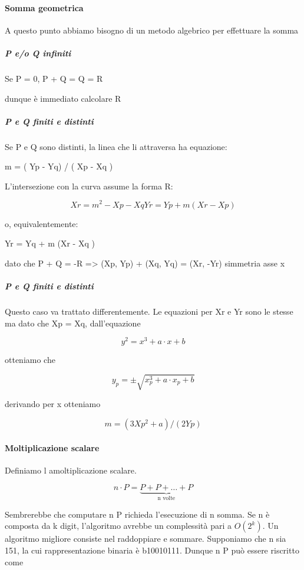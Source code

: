 \documentclass{book}
\theoremstyle{definition}
\begin{document}
\paragraph{Somma geometrica}

A questo punto abbiamo bisogno di un metodo algebrico per effettuare la somma

\subparagraph{P e/o Q infiniti}

Se P = 0, P + Q = Q = R

dunque è immediato calcolare R

\subparagraph{P e Q finiti e distinti}

Se P e Q sono distinti, la linea che li attraversa ha equazione:

m = ( Yp - Yq) / ( Xp - Xq )

L'intersezione con la curva assume la forma R:

\[
    Xr = m^{2} - Xp - Xq
    Yr = Yp + m ( Xr - Xp )
\]

o, equivalentemente:

Yr = Yq + m (Xr - Xq )

dato che P + Q = -R => (Xp, Yp) + (Xq, Yq) = (Xr, -Yr) simmetria asse x

\subparagraph{P e Q finiti e distinti}

Questo caso va trattato differentemente. Le equazioni per Xr e Yr sono le stesse ma dato che Xp = Xq, dall'equazione

\[
    y^{2} = x^{3} + a \cdot x + b
\]

otteniamo che

\[
    y_{p} = \pm \sqrt{x_{p}^{3} + a \cdot x_{p} + b}
\]

derivando per x otteniamo

\[
    m = ( 3 Xp^{2} + a ) / ( 2 Yp )
\]

\paragraph{Moltiplicazione scalare}

Definiamo l amoltiplicazione scalare.

\[
n \cdot P = \underbrace{P + P + \dots + P}_\text{n volte}
\]

Sembrerebbe che computare n P richieda l'esecuzione di n somma. Se n è composta da k digit, l'algoritmo avrebbe un complessità pari a $O(2^{k})$.
Un algoritmo migliore consiste nel raddoppiare e sommare. Supponiamo che n sia 151, la cui rappresentazione binaria è b10010111.
Dunque n P può essere riscritto come
\end{document}
